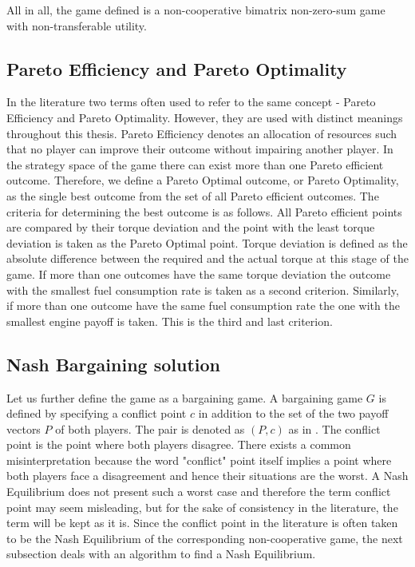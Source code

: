 All in all, the game defined is a non-cooperative bimatrix non-zero-sum game with non-transferable utility.

\subsection{Pareto Efficiency and Pareto Optimality}
In the literature two terms often used to refer to the same concept - Pareto Efficiency and Pareto Optimality. However, they are used with distinct meanings throughout this thesis. Pareto Efficiency denotes an allocation of resources such that no player can improve their outcome without impairing another player. In the strategy space of the game there can exist more than one Pareto efficient outcome. Therefore, we define a Pareto Optimal outcome, or Pareto Optimality, as the single best outcome from the set of all Pareto efficient outcomes. The criteria for determining the best outcome is as follows. All Pareto efficient points are compared by their torque deviation and the point with the least torque deviation is taken as the Pareto Optimal point. Torque deviation is defined as the absolute difference between the required and the actual torque at this stage of the game. If more than one outcomes have the same torque deviation the outcome with the smallest fuel consumption rate is taken as a second criterion. Similarly, if more than one outcome have the same fuel consumption rate the one with the smallest engine payoff is taken. This is the third and last criterion.

\subsection{Nash Bargaining solution}
Let us further define the game as a bargaining game. A bargaining game $G$ is defined by specifying a conflict point $c$ in addition to the set of the two payoff vectors $P$ of both players. The pair is denoted as $(P,c)$ as in \citet{holler2006einfuhrung}. The conflict point is the point where both players disagree. There exists a common misinterpretation because the word "conflict" point itself implies a point where both players face a disagreement and hence their situations are the worst. A Nash Equilibrium does not present such a worst case and therefore the term conflict point may seem misleading, but for the sake of consistency in the literature, the term will be kept as it is. Since the conflict point in the literature is often taken to be the Nash Equilibrium of the corresponding non-cooperative game, the next subsection deals with an algorithm to find a Nash Equilibrium.

